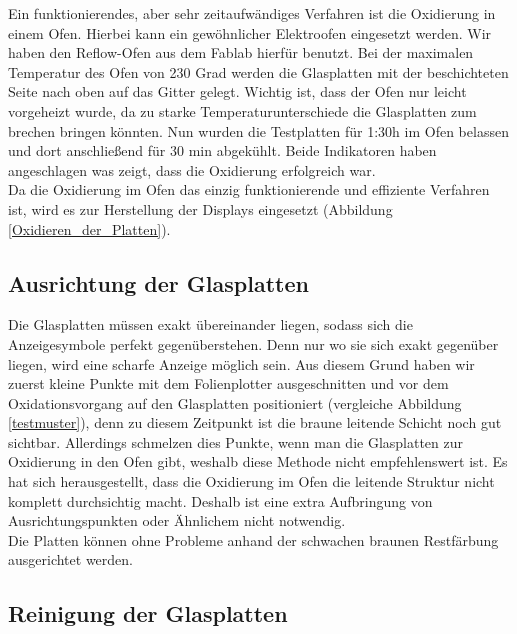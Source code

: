 Ein funktionierendes, aber sehr zeitaufwändiges Verfahren ist die Oxidierung in einem Ofen. Hierbei kann ein gewöhnlicher Elektroofen eingesetzt werden. Wir haben den Reflow-Ofen aus dem Fablab hierfür benutzt.
Bei der maximalen Temperatur des Ofen von 230 Grad werden die Glasplatten mit der beschichteten Seite nach oben auf das Gitter gelegt. Wichtig ist, dass der Ofen nur leicht vorgeheizt wurde, da zu starke Temperaturunterschiede die Glasplatten zum brechen bringen könnten. Nun wurden die Testplatten für 1:30h im Ofen belassen und dort anschließend für 30 min abgekühlt.
Beide Indikatoren haben angeschlagen was zeigt, dass die Oxidierung erfolgreich war.\\

Da die Oxidierung im Ofen das einzig funktionierende und effiziente Verfahren ist, wird es zur Herstellung der Displays eingesetzt (Abbildung \ref{Oxidieren_der_Platten}). 

\subsection{Ausrichtung der Glasplatten}

Die Glasplatten müssen exakt übereinander liegen, sodass sich die Anzeigesymbole perfekt gegenüberstehen. Denn nur wo sie sich exakt gegenüber liegen, wird eine scharfe Anzeige möglich sein.
Aus diesem Grund haben wir zuerst kleine Punkte mit dem Folienplotter ausgeschnitten und vor dem Oxidationsvorgang auf den Glasplatten positioniert (vergleiche Abbildung \ref{testmuster}), denn zu diesem Zeitpunkt ist die braune leitende Schicht noch gut sichtbar. Allerdings schmelzen dies Punkte, wenn man die Glasplatten zur Oxidierung in den Ofen gibt, weshalb diese Methode nicht empfehlenswert ist.
Es hat sich herausgestellt, dass die Oxidierung im Ofen die leitende Struktur nicht komplett durchsichtig macht. Deshalb ist eine extra Aufbringung von Ausrichtungspunkten oder Ähnlichem nicht notwendig.\\
Die Platten können ohne Probleme anhand der schwachen braunen Restfärbung ausgerichtet werden.

\subsection{Reinigung der Glasplatten}


